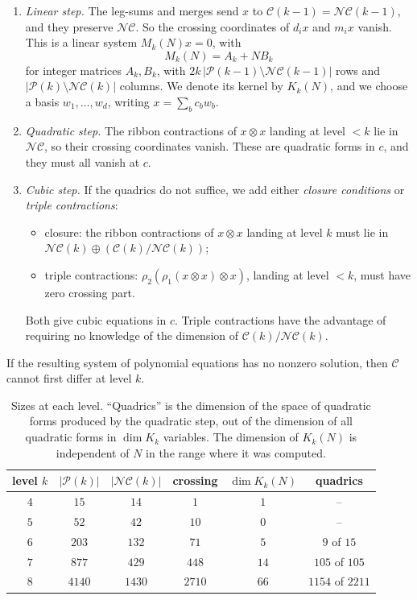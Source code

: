 \documentclass[11pt]{amsart}
\theoremstyle{definition}
\theoremstyle{remark}
\theoremstyle{plain}
\numberwithin{equation}{section}
\numberwithin{table}{section}
\newcommand{\NC}{\mathcal{NC}}
\newcommand{\Pp}{\mathcal{P}}
\begin{document}
\begin{enumerate}
\item \emph{Linear step.} The leg-sums and merges send $x$ to $\mathcal C(k-1)=\NC(k-1)$, and they preserve $\NC$. So the crossing coordinates of $d_ix$ and $m_ix$ vanish. This is a linear system $M_k(N)x=0$, with
\[
M_k(N)=A_k+NB_k
\]
for integer matrices $A_k,B_k$, with $2k\,|\Pp(k-1)\setminus\NC(k-1)|$ rows and $|\Pp(k)\setminus\NC(k)|$ columns. We denote its kernel by $K_k(N)$, and we choose a basis $w_1,\dots,w_d$, writing $x=\sum_bc_bw_b$.
\item \emph{Quadratic step.} The ribbon contractions of $x\otimes x$ landing at level $<k$ lie in $\NC$, so their crossing coordinates vanish. These are quadratic forms in $c$, and they must all vanish at $c$.
\item \emph{Cubic step.} If the quadrics do not suffice, we add either \emph{closure conditions} or \emph{triple contractions}:
\begin{itemize}
\item closure: the ribbon contractions of $x\otimes x$ landing at level $k$ must lie in $\NC(k)\oplus(\mathcal C(k)/\NC(k))$;
\item triple contractions: $\rho_2(\rho_1(x\otimes x)\otimes x)$, landing at level $<k$, must have zero crossing part.
\end{itemize}
Both give cubic equations in $c$. Triple contractions have the advantage of requiring no knowledge of the dimension of $\mathcal C(k)/\NC(k)$.
\end{enumerate}

If the resulting system of polynomial equations has no nonzero solution, then $\mathcal C$ cannot first differ at level $k$.

\begin{table}[ht]
\centering
\begin{tabular}{@{}cccccc@{}}
\toprule
level $k$ & $|\Pp(k)|$ & $|\NC(k)|$ & crossing & $\dim K_k(N)$ & quadrics\\
\midrule
$4$ & $15$ & $14$ & $1$ & $1$ & --\\
$5$ & $52$ & $42$ & $10$ & $0$ & --\\
$6$ & $203$ & $132$ & $71$ & $5$ & $9$ of $15$\\
$7$ & $877$ & $429$ & $448$ & $14$ & $105$ of $105$\\
$8$ & $4140$ & $1430$ & $2710$ & $66$ & $1154$ of $2211$\\
\bottomrule
\end{tabular}
\caption{Sizes at each level. ``Quadrics'' is the dimension of the space of quadratic forms produced by the quadratic step, out of the dimension of all quadratic forms in $\dim K_k$ variables. The dimension of $K_k(N)$ is independent of $N$ in the range where it was computed.}
\label{tab:sizes}
\end{table}
\end{document}
